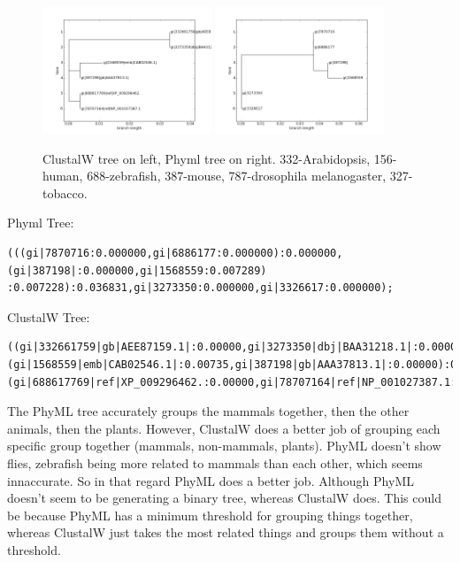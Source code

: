 \documentclass[10pt]{article} %
\begin{document}
\begin{figure}[h!]
  \centering
  \includegraphics[width=0.45\textwidth]{h3-clustalw.png}
  \includegraphics[width=0.45\textwidth]{h3-phyml.png}
  \caption{ClustalW tree on left, Phyml tree on right. 332-Arabidopsis, 156-human, 688-zebrafish,
  387-mouse, 787-drosophila melanogaster, 327-tobacco.}
\end{figure}

Phyml Tree:
\begin{verbatim}
(((gi|7870716:0.000000,gi|6886177:0.000000):0.000000,(gi|387198|:0.000000,gi|1568559:0.007289)
:0.007228):0.036831,gi|3273350:0.000000,gi|3326617:0.000000);
\end{verbatim}

ClustalW Tree:
\begin{verbatim}
((gi|332661759|gb|AEE87159.1|:0.00000,gi|3273350|dbj|BAA31218.1|:0.00000):0.03309,
(gi|1568559|emb|CAB02546.1|:0.00735,gi|387198|gb|AAA37813.1|:0.00000):0.00368,
(gi|688617769|ref|XP_009296462.:0.00000,gi|78707164|ref|NP_001027387.1:0.00000):0.00368);
\end{verbatim}

The PhyML tree accurately groups the mammals together, then the other animals, then the plants.
However, ClustalW does a better job of grouping each specific group together (mammals, non-mammals,
plants). PhyML doesn't show flies, zebrafish being more related to mammals than each other,
which seems innaccurate. So in that regard PhyML does a better job. Although PhyML doesn't seem
to be generating a binary tree, whereas ClustalW does. This could be because PhyML has a minimum
threshold for grouping things together, whereas ClustalW just takes the most related things and
groups them without a threshold.\\
\end{document}
